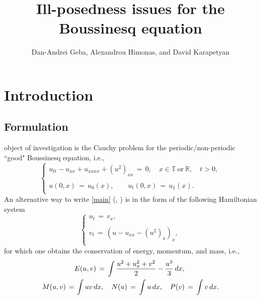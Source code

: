 \documentclass{amsart}
\begin{document}
\title{Ill-posedness issues for the Boussinesq equation}

\author{Dan-Andrei Geba, Alexandrou Himonas, and David Karapetyan}

\address{Department of Mathematics, University of Rochester, Rochester, NY 14627}
\address{Department of Mathematics, University of Notre Dame, Notre Dame, IN 46556}
\address{Department of Mathematics, University of Notre Dame, Notre Dame, IN 46556}
\date{}



\maketitle

\section{Introduction}

\subsection{Formulation}  object of investigation is the Cauchy problem for
the periodic/non-periodic ``good" Boussinesq equation, i.e.,
\begin{equation}
\left\{
\begin{array}{l}
u_{tt}-u_{xx}+u_{xxxx}+(u^2)_{xx}\,=\,0, \quad x\in \mathbb{T}\ \text{or} \ \mathbb{R}, \quad t>0,\\
\\
u(0,x)\,=\,u_0(x),\qquad u_t(0,x)\,=\,u_1(x).\\
\end{array}\right.
\label{main}
\end{equation}
%
%
An alternative way to write \eqref{main} (\cite{Linares:1993ly},
\cite{Fang:1996zr}) is in the form of the following Hamiltonian system
\begin{equation}
\left\{
\begin{array}{l}
u_{t}\,=\,v_{x},\\
\\
v_t\,=\, \left(u-u_{xx}-(u^2)_x\right)_x,\\
\end{array}\right.
\label{sys}
\end{equation}
for which one obtains the conservation of energy, momentum, and mass, i.e.,
\[
\aligned
&E(u,v)\,=\,\int \frac{u^2+u_x^2+v^2}{2} - \frac{u^3}{3}\,dx,\\
M(u,v)\,=&\,\int uv \,dx, \quad N(u)\,=\,\int u \,dx,\quad P(v)\,=\,\int v \,dx.
\endaligned
\]
\end{document}
